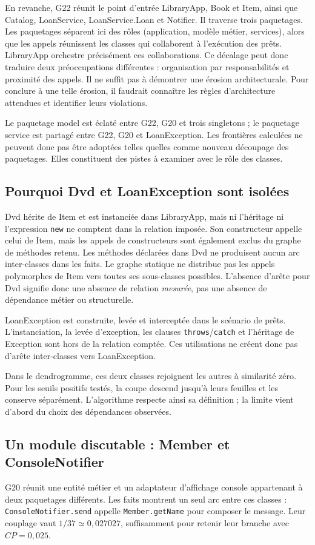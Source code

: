 \documentclass[11pt,a4paper]{article}
\begin{document}
En revanche, G22 réunit le point d'entrée LibraryApp, Book et Item, ainsi que
Catalog, LoanService, LoanService.Loan et Notifier. Il traverse trois paquetages.
Les paquetages séparent ici des rôles (application, modèle métier, services),
alors que les appels réunissent les classes qui collaborent à l'exécution des
prêts. LibraryApp orchestre précisément ces collaborations. Ce décalage peut
donc traduire deux préoccupations différentes : organisation par responsabilités
et proximité des appels. Il ne suffit pas à démontrer une érosion architecturale.
Pour conclure à une telle érosion, il faudrait connaître les règles
d'architecture attendues et identifier leurs violations.

Le paquetage model est éclaté entre G22, G20 et trois singletons ; le paquetage
service est partagé entre G22, G20 et LoanException. Les frontières calculées
ne peuvent donc pas être adoptées telles quelles comme nouveau découpage des
paquetages. Elles constituent des pistes à examiner avec le rôle des classes.

\subsection{Pourquoi Dvd et LoanException sont isolées}
Dvd hérite de Item et est instanciée dans LibraryApp, mais ni l'héritage ni
l'expression \texttt{new} ne comptent dans la relation imposée. Son constructeur
appelle celui de Item, mais les appels de constructeurs sont également exclus
du graphe de méthodes retenu. Les méthodes déclarées dans Dvd ne produisent
aucun arc inter-classes dans les faits. Le graphe statique ne distribue pas
les appels polymorphes de Item vers toutes ses sous-classes possibles.
L'absence d'arête pour Dvd signifie donc une absence de relation \emph{mesurée},
pas une absence de dépendance métier ou structurelle.

LoanException est construite, levée et interceptée dans le scénario de prêts.
L'instanciation, la levée d'exception, les clauses \texttt{throws}/\texttt{catch}
et l'héritage de Exception sont hors de la relation comptée. Ces utilisations
ne créent donc pas d'arête inter-classes vers LoanException.

Dans le dendrogramme, ces deux classes rejoignent les autres à similarité zéro.
Pour les seuils positifs testés, la coupe descend jusqu'à leurs feuilles et
les conserve séparément. L'algorithme respecte ainsi sa définition ; la limite
vient d'abord du choix des dépendances observées.

\subsection{Un module discutable : Member et ConsoleNotifier}
G20 réunit une entité métier et un adaptateur d'affichage console appartenant
à deux paquetages différents. Les faits montrent un seul arc entre ces classes :
\texttt{ConsoleNotifier.send} appelle \texttt{Member.getName} pour composer le
message. Leur couplage vaut $1/37\simeq0{,}027027$, suffisamment pour retenir
leur branche avec $CP=0{,}025$.
\end{document}
